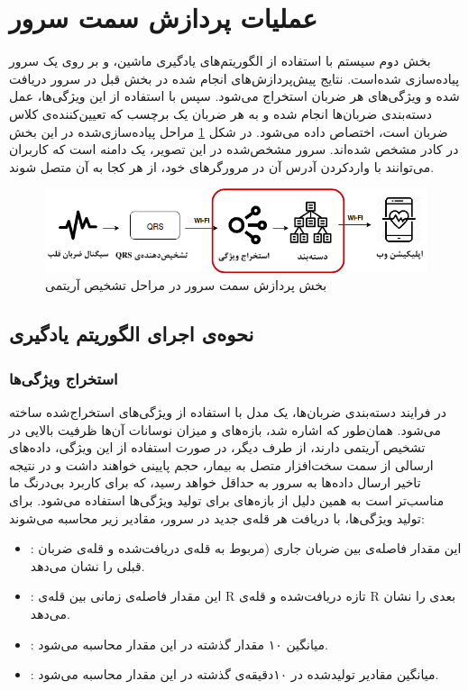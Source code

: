 	

\section{عملیات پردازش سمت سرور}
بخش دوم سیستم با استفاده از الگوریتم‌های یادگیری ماشین، و بر روی یک سرور پیاده‌سازی شده‌است. نتایج پیش‌پردازش‌های انجام شده در بخش قبل در سرور دریافت شده و ویژگی‌های هر ضربان استخراج می‌شود. سپس با استفاده از این ویژگی‌ها، عمل دسته‌بندی ضربان‌ها انجام شده و به هر ضربان یک برچسب که تعیین‌کننده‌ی کلاس ضربان است، اختصاص داده می‌شود. در شکل \ref{fig:server} مراحل پیاده‌سازی‌شده در این بخش در کادر مشخص شده‌اند. سرور مشخص‌شده در این تصویر، یک دامنه است که کاربران می‌توانند با واردکردن آدرس آن در مرورگرهای خود، از هر کجا به آن متصل شوند.

\begin{figure}[!htb]
\centering
\includegraphics[width=16cm]{Figures/server.png}
\caption{بخش پردازش سمت سرور در مراحل تشخیص آریتمی}
\label{fig:server}
\end{figure}	
	

	\subsection{نحوه‌ی اجرای الگوریتم یادگیری}
		
		\subsubsection{استخراج ویژگی‌ها}
		در فرایند دسته‌بندی ضربان‌‌ها، یک مدل   با استفاده از ویژگی‌های استخراج‌شده ساخته می‌شود. همان‌طور که اشاره شد، بازه‌های  و میزان نوسانات آن‌ها ظرفیت بالایی در تشخیص آریتمی دارند، از طرف دیگر، در صورت استفاده از این ویژگی، داده‌های ارسالی از سمت سخت‌افزار متصل به بیمار، حجم پایینی خواهند داشت و در نتیجه تاخیر ارسال داده‌ها به سرور به حداقل خواهد رسید، که برای کاربرد بی‌درنگ ما مناسب‌تر است به همین دلیل از بازه‌های  برای تولید ویژگی‌ها استفاده می‌شود.
برای تولید ویژگی‌ها، با دریافت هر قله‌ی  جدید در سرور، مقادیر زیر محاسبه می‌شوند:
\begin{itemize}
	\item {}: این مقدار فاصله‌ی بین ضربان جاری (مربوط به قله‌ی  دریافت‌شده و قله‌ی ضربان قبلی را نشان می‌دهد.
	\item {}: این مقدار فاصله‌ی زمانی بین قله‌ی R تازه دریافت‌شده و قله‌ی R بعدی را نشان می‌دهد.
	\item {}: میانگین ۱۰ مقدار  گذشته در این مقدار محاسبه می‌شود.
	\item {}: میانگین مقادیر   تولیدشده در ۱۰دقیقه‌ی گذشته در این مقدار محاسبه می‌شود.
\end{itemize}

